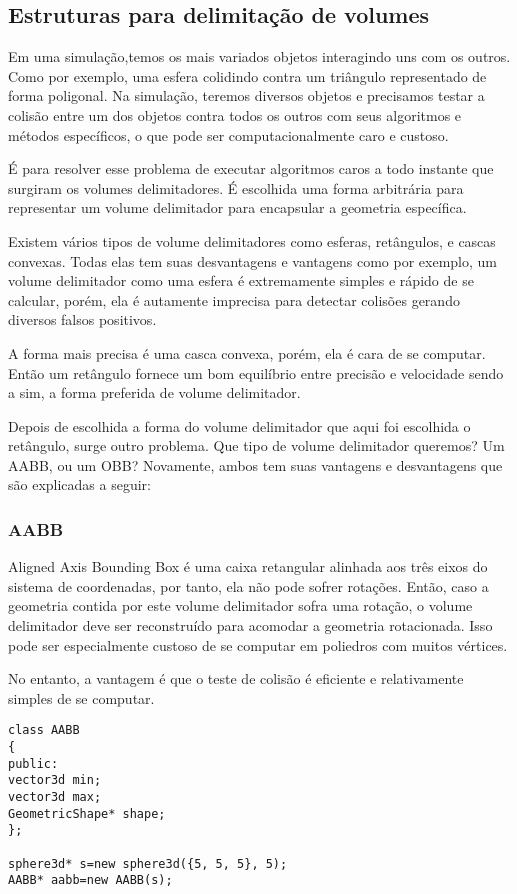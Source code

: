\subsection{ Estruturas para delimitação de volumes}
Em uma simulação,temos os mais variados objetos interagindo uns com os outros.
Como por exemplo, uma esfera colidindo contra um triângulo representado de
forma poligonal. Na simulação, teremos diversos objetos e precisamos testar a
colisão entre um dos objetos contra todos os outros com seus algoritmos e
métodos específicos, o que pode ser computacionalmente caro e custoso.

É para resolver esse problema de executar algoritmos caros a todo instante que
surgiram os volumes delimitadores. É escolhida uma forma arbitrária para
representar um volume delimitador para encapsular a geometria específica.

Existem vários tipos de volume delimitadores como esferas, retângulos, e cascas
convexas. Todas elas tem suas desvantagens e vantagens como por exemplo, um
volume delimitador como uma esfera é extremamente simples e rápido de se
calcular, porém, ela é autamente imprecisa para detectar colisões gerando
diversos falsos positivos.

A forma mais precisa é uma casca convexa, porém, ela é cara de se computar.
Então um retângulo fornece um bom equilíbrio entre precisão e velocidade sendo
a sim, a forma preferida de volume delimitador.

Depois de escolhida a forma do volume delimitador que aqui foi escolhida o
retângulo, surge outro problema. Que tipo de volume delimitador queremos? Um
AABB, ou um OBB? Novamente, ambos tem suas vantagens e desvantagens que são
explicadas a seguir:

\subsubsection{AABB}
Aligned Axis Bounding Box é uma caixa retangular alinhada aos três eixos do
sistema de coordenadas, por tanto, ela não pode sofrer rotações. Então, caso a
geometria contida por este volume delimitador sofra uma rotação, o volume
delimitador deve ser reconstruído para acomodar a geometria rotacionada. Isso
pode ser especialmente custoso de se computar em poliedros com muitos vértices.

No entanto, a vantagem é que o teste de colisão é eficiente e relativamente
simples de se computar.

\begin{lstlisting}[frame=single,caption=Exemplo de AABB\label{codigo1}]
class AABB
{
public:
vector3d min;
vector3d max;
GeometricShape* shape;
};

sphere3d* s=new sphere3d({5, 5, 5}, 5);
AABB* aabb=new AABB(s);
\end{lstlisting}

